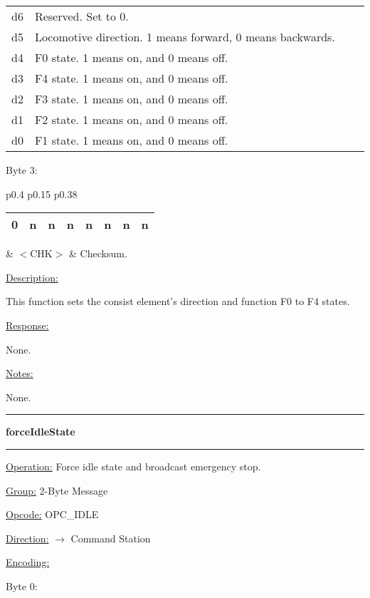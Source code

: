 \begin{tabular}{p{0.05\linewidth} p{0.95\linewidth}} 
d6 & Reserved. Set to 0.\\
d5 & Locomotive direction. 1 means forward, 0 means backwards.\\
d4 & F0 state. 1 means on, and 0 means off.\\
d3 & F4 state. 1 means on, and 0 means off.\\
d2 & F3 state. 1 means on, and 0 means off.\\
d1 & F2 state. 1 means on, and 0 means off.\\
d0 & F1 state. 1 means on, and 0 means off.\\
\end{tabular}

Byte 3:

\begin{tabular}{p{0.4\linewidth} p{0.15\linewidth} p{0.38\linewidth}} 

\begin{tabular}{|p{0.3cm}|p{0.3cm}|p{0.3cm}|p{0.3cm}|p{0.3cm}|p{0.3cm}|p{0.3cm}|p{0.3cm}|}
\hline
0 & n & n & n & n & n & n & n\\
\hline
\end{tabular}
& $<$CHK$>$ & Checksum.
\end{tabular}

\underline{Description:}

This function sets the consist element's direction and function F0 to F4 states.

\underline{Response:} 

None.

\underline{Notes:} 

None.

\rule{15.1cm}{0.4pt}

\LARGE\textbf{forceIdleState}\normalsize

\rule{15.1cm}{0.4pt}

\underline{Operation:} Force idle state and broadcast emergency stop.

\underline{Group:} \hspace{0.5cm} 2-Byte Message

\underline{Opcode:} \hspace{0.5cm} OPC\_IDLE

\underline{Direction:} \hspace{0.05cm} $\rightarrow$ Command Station

\underline{Encoding:} 

Byte 0:

